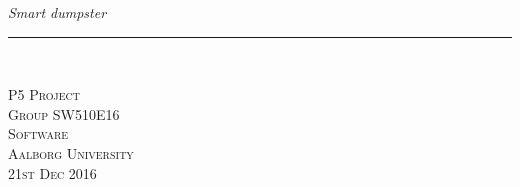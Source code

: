 \thispagestyle{empty}
\begin{flushright}
\vspace{3cm}

\phantom{hul}

\phantom{hul}

\phantom{hul}

\textsl{\Huge Smart dumpster} \\ \vspace{1cm}

\rule{13cm}{3mm} \\ \vspace{1.5cm}
\vspace{1cm}



\vspace{7cm} 
\textsc{\Large P5 Project \\
Group SW510E16 \\
Software\\
Aalborg University\\
21st Dec 2016\\}
\end{flushright}
